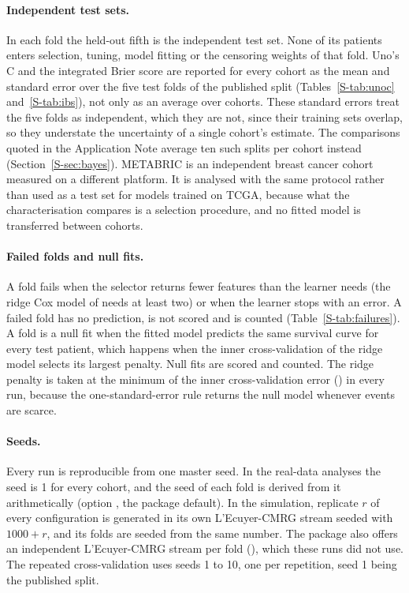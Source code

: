 \paragraph{Independent test sets.} In each fold the held-out fifth is the independent
test set. None of its patients enters selection, tuning, model fitting or the censoring
weights of that fold. Uno's C and the integrated Brier score are reported for every
cohort as the mean and standard error over the five test folds of the published split
(Tables~\ref{S-tab:unoc} and~\ref{S-tab:ibs}), not only as an average over cohorts. These
standard errors treat the five folds as independent, which they are not, since their
training sets overlap, so they understate the uncertainty of a single cohort's estimate.
The comparisons quoted in the Application Note average ten such splits per cohort
instead (Section~\ref{S-sec:bayes}). METABRIC is an
independent breast cancer cohort measured
on a different platform. It is analysed with the same protocol rather than used as a
test set for models trained on TCGA, because what the characterisation compares is a
selection procedure, and no fitted model is transferred between cohorts.

\paragraph{Failed folds and null fits.} A fold fails when the selector returns fewer
features than the learner needs (the ridge Cox model of  needs at least two)
or when the learner stops with an error. A failed fold has no prediction, is not scored
and is counted (Table~\ref{S-tab:failures}). A fold is a null fit when the fitted model
predicts the same survival curve for every test patient, which happens when the inner
cross-validation of the ridge model selects its largest penalty. Null fits are scored and
counted. The ridge penalty is taken at the minimum of the inner cross-validation error
() in every run, because the one-standard-error rule returns the null
model whenever events are scarce.

\paragraph{Seeds.} Every run is reproducible from one master seed. In the real-data
analyses the seed is 1 for every cohort, and the seed of each fold is derived from it
arithmetically (option , the package default). In the
simulation, replicate $r$ of every configuration is generated in its own
L'Ecuyer-CMRG stream seeded with $1000 + r$, and its folds are seeded from the same
number. The package also offers an independent L'Ecuyer-CMRG stream per fold
(), which these runs did not use. The repeated cross-validation uses
seeds 1 to 10, one per repetition, seed 1 being the published split.

